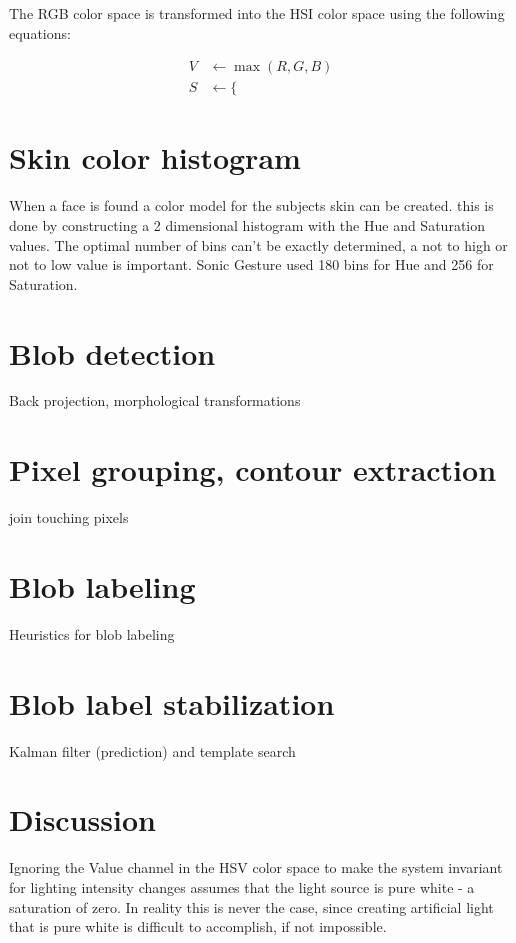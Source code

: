  The RGB color space is transformed into the HSI color space using the following equations:

\begin{eqnarray*}
	V&\leftarrow \max(R,G,B) \label{first} \\
	S&\leftarrow \{
\end{eqnarray*}



\section{Skin color histogram}
When a face is found a color model for the subjects skin can be created. this is done by constructing a 2 dimensional histogram with the Hue and Saturation values. The optimal number of bins can't be exactly determined, a not to high or not to low value is important. 
Sonic Gesture used 180 bins for Hue and 256 for Saturation. 

\section{Blob detection}
Back projection, morphological transformations

\section{Pixel grouping, contour extraction}
join touching pixels

\section{Blob labeling}
Heuristics for blob labeling

\section{Blob label stabilization}
Kalman filter (prediction) and template search

\section{Discussion}
Ignoring the Value channel in the HSV color space to make the system invariant for lighting intensity changes assumes that the light source is pure white - a saturation of zero. In reality this is never the case, since creating artificial light that is pure white is difficult to accomplish, if not impossible.